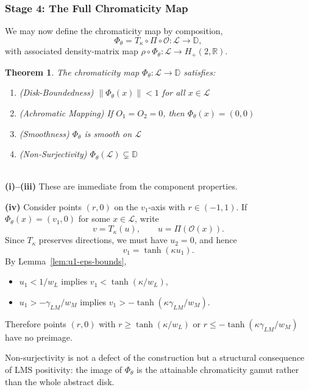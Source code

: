 \documentclass[11pt]{article}
\makeatletter
\theoremstyle{plain}
\newtheorem{theorem}{Theorem}[section]
\theoremstyle{definition}
\theoremstyle{remark}
\renewenvironment{proof}[1][\proofname]{\par\pushQED{\qed}\normalfont
\topsep6\p@\@plus6\p@\relax
\trivlist\item[\hskip\labelsep\bfseries #1\@addpunct{.}]\mbox{}\\\ignorespaces}{\popQED\endtrivlist\@endpefalse}
\newcommand{\R}{\mathbb{R}}
\newcommand{\D}{\mathbb{D}}
\newcommand{\norm}[1]{\left\lVert #1 \right\rVert}
\makeatother
\begin{document}
\subsubsection{Stage 4: The Full Chromaticity Map}

We may now define the chromaticity map by composition,
\begin{equation}
\boxed{
\Phi_\theta = T_\kappa \circ \Pi \circ \mathcal{O}: \mathcal{L} \to \D,
}
\end{equation}
with associated density-matrix map $\rho \circ \Phi_\theta: \mathcal{L} \to H_+(2,\R)$.

\begin{theorem}
\label{thm:main-props}
The chromaticity map $\Phi_\theta: \mathcal{L} \to \D$ satisfies:
\begin{enumerate}[label=(\roman*)]
    \item (Disk-Boundedness) $\norm{\Phi_\theta(x)} < 1$ for all $x \in \mathcal{L}$
    \item (Achromatic Mapping) If $O_1 = O_2 = 0$, then $\Phi_\theta(x) = (0,0)$
    \item (Smoothness) $\Phi_\theta$ is smooth on $\mathcal{L}$
    \item (Non-Surjectivity) $\Phi_\theta(\mathcal{L}) \subsetneq \D$
\end{enumerate}
\end{theorem}

\begin{proof}
\noindent\textbf{(i)--(iii)} These are immediate from the component properties.

\noindent\textbf{(iv)} Consider points $(r,0)$ on the $v_1$-axis with $r \in (-1,1)$. If
$\Phi_\theta(x) = (v_1,0)$ for some $x \in \mathcal{L}$, write
\[
 v = T_\kappa(u), \qquad u = \Pi(\mathcal{O}(x)).
\]
Since $T_\kappa$ preserves directions, we must have $u_2 = 0$, and hence
\[
 v_1 = \tanh(\kappa u_1).
\]
By Lemma~\ref{lem:u1-eps-bounds},
\begin{itemize}
    \item $u_1 < 1/w_L$ implies $v_1 < \tanh(\kappa/w_L)$,
    \item $u_1 > -\gamma_{LM}/w_M$ implies $v_1 > -\tanh(\kappa\gamma_{LM}/w_M)$.
\end{itemize}
\noindent Therefore points $(r,0)$ with $r \geq \tanh(\kappa/w_L)$ or
$r \leq -\tanh(\kappa\gamma_{LM}/w_M)$ have no preimage.
\end{proof}

Non-surjectivity is not a defect of the construction but a structural consequence of LMS positivity: the image of $\Phi_\theta$ is the attainable chromaticity gamut rather than the whole abstract disk.
\end{document}
